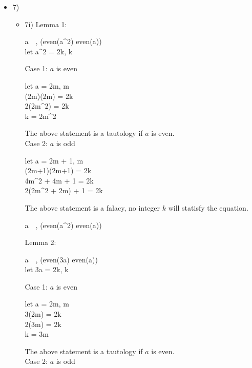 \documentclass[ 12pt ]{article}
\begin{document}
\begin{itemize}
	\item[] {7) \large}
	\begin{itemize}
		\item[] 7i)
		Lemma 1:
		\begin{flalign}
			\forall a\, \epsilon\, , (even(a^2) \rightarrow even(a)) \nonumber \\
			let\;\;\; a^2 = 2k,\; k\, \epsilon\,  \nonumber
		\end{flalign}
		Case 1: $a$ is even
		\begin{flalign}
			let\;\;\; a = 2m,\; m\, \epsilon\,  \nonumber \\
			(2m)(2m) = 2k \nonumber \\
			2(2m^2) = 2k \nonumber \\
			k = 2m^2\, \epsilon\,  \nonumber
		\end{flalign}
		The above statement is a tautology if $a$ is even. \\
		Case 2: $a$ is odd
		\begin{flalign}
			let\;\;\; a = 2m + 1,\; m\, \epsilon\,  \nonumber \\
			(2m+1)(2m+1) = 2k \nonumber \\
			4m^2 + 4m + 1 = 2k \nonumber \\
			2(2m^2 + 2m) + 1 = 2k \nonumber
		\end{flalign}
		The above statement is a falacy, no integer $k$ will statisfy the equation.
		\begin{flalign}
			\therefore \forall a\, \epsilon\, , (even(a^2) \rightarrow even(a)) \nonumber
		\end{flalign}
		Lemma 2:
		\begin{flalign}
			\forall a\, \epsilon\, , (even(3a) \rightarrow even(a)) \nonumber \\
			let\;\;\; 3a = 2k,\; k\, \epsilon\,  \nonumber
		\end{flalign}
		Case 1: $a$ is even
		\begin{flalign}
			let\;\;\; a = 2m,\; m\, \epsilon\,  \nonumber \\
			3(2m) = 2k \nonumber \\
			2(3m) = 2k \nonumber \\
			k = 3m\, \epsilon\,  \nonumber
		\end{flalign}
		The above statement is a tautology if $a$ is even. \\
		Case 2: $a$ is odd
		\begin{flalign}

\end{flalign}
\end{itemize}
\end{itemize}
\end{document}
